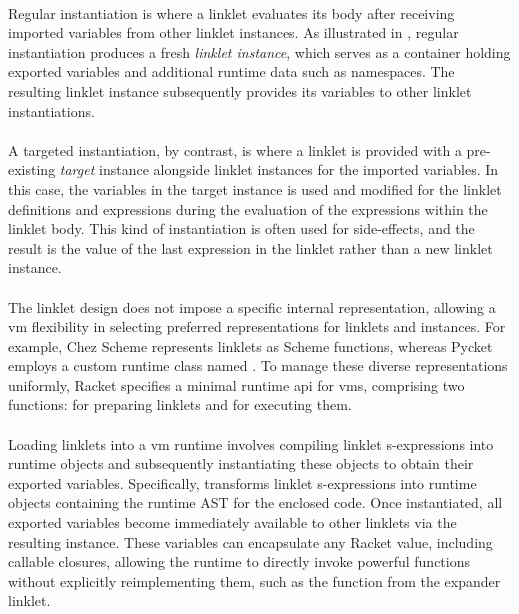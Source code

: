
		\paragraph{}%
			Regular instantiation is where a linklet evaluates its body after receiving imported variables from other linklet instances. As illustrated in , regular instantiation produces a fresh \emph{linklet instance}, which serves as a container holding exported variables and additional runtime data such as namespaces. The resulting linklet instance subsequently provides its variables to other linklet instantiations.

		\paragraph{}%
			A targeted instantiation, by contrast, is where a linklet is provided with a pre-existing \emph{target} instance alongside linklet instances for the imported variables. In this case, the variables in the target instance is used and modified for the linklet definitions and expressions during the evaluation of the expressions within the linklet body. This kind of instantiation is often used for side-effects, and the result is the value of the last expression in the linklet rather than a new linklet instance.

		\paragraph{}%
			The linklet design does not impose a specific internal representation, allowing a \gls{vm} flexibility in selecting preferred representations for linklets and instances. For example, Chez Scheme represents linklets as Scheme functions, whereas Pycket employs a custom runtime class named . To manage these diverse representations uniformly, Racket specifies a minimal runtime \gls{api} for \glspl{vm}, comprising two functions:  for preparing linklets and  for executing them.

		\paragraph{}%
			Loading linklets into a \gls{vm} runtime involves compiling linklet s-expressions into runtime objects and subsequently instantiating these objects to obtain their exported variables. Specifically,  transforms linklet s-expressions into runtime objects containing the runtime AST for the enclosed code. Once instantiated, all exported variables become immediately available to other linklets via the resulting instance. These variables can encapsulate any Racket value, including callable closures, allowing the runtime to directly invoke powerful functions without explicitly reimplementing them, such as the  function from the expander linklet.


